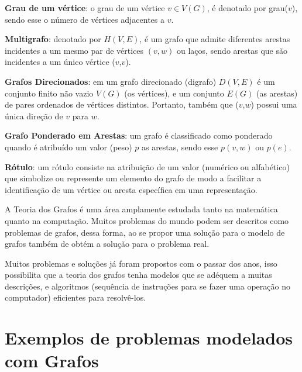 \begin{definition} 
\textbf{Grau de um vértice}: o grau de um vértice $v \in V(G)$, é denotado por grau($v$), sendo esse o número de vértices adjacentes a $v$.
\end{definition}

\begin{definition} 
\textbf{Multigrafo}: denotado por $H(V,E)$, é um grafo que admite diferentes arestas incidentes a um mesmo par de vértices $(v,w)$ ou laços, sendo arestas que são incidentes a um único vértice ($v$,$v$).
\end{definition}

\begin{definition} 
\textbf{Grafos Direcionados}: em um grafo direcionado (digrafo) $D(V,E)$ é um conjunto finito não vazio $V(G)$ (os vértices), e um conjunto $E(G)$ (as arestas) de pares ordenados de vértices distintos. Portanto, também que ($v$,$w$) possui uma única direção de $v$ para $w$.
\end{definition}

\begin{definition} 
\textbf{Grafo Ponderado em Arestas}: um grafo é classificado como ponderado quando é atribuído um valor (peso) $p$ as arestas, sendo esse $p(v,w)$ ou $p(e)$.
\end{definition}

\begin{definition} 
\textbf{Rótulo}: um rótulo consiste na atribuição de um valor (numérico ou alfabético) que simbolize ou represente um elemento do grafo de modo a facilitar a identificação de um vértice ou aresta específica em uma representação.
\end{definition}

A Teoria dos Grafos é uma área amplamente estudada tanto na matemática quanto na computação. Muitos problemas do mundo podem ser descritos como problemas de grafos, dessa forma, ao se propor uma solução para o modelo de grafos também de obtém a solução para o problema real.

Muitos problemas e soluções já foram propostos com o passar dos anos, isso possibilita que a teoria dos grafos tenha modelos que se adéquem a muitas descrições, e algoritmos (sequência de instruções para se fazer uma operação no computador) eficientes para resolvê-los.

\section{Exemplos de problemas modelados com Grafos}

